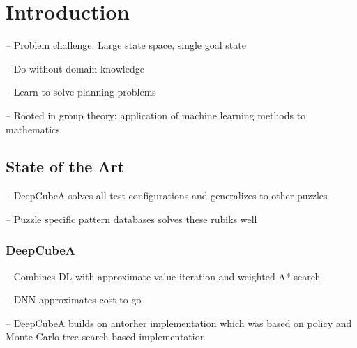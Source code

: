 \documentclass[../main.tex]{subfiles}
\begin{document}
\chapter{Introduction}

-- Problem challenge: Large state space, single goal state 

-- Do without domain knowledge

-- Learn to solve planning problems

-- Rooted in group theory: application of machine learning methods to mathematics
\section{State of the Art}
\cite{SolvingNature}
-- DeepCubeA solves all test configurations and generalizes to other puzzles

-- Puzzle specific pattern databases solves these rubiks well

\subsection{DeepCubeA}
\cite{SolvingNature}
-- Combines DL with approximate value iteration and weighted A* search

-- DNN approximates cost-to-go 

-- DeepCubeA builds on antorher implementation which was based on policy and Monte Carlo tree search based implementation 
\end{document}
